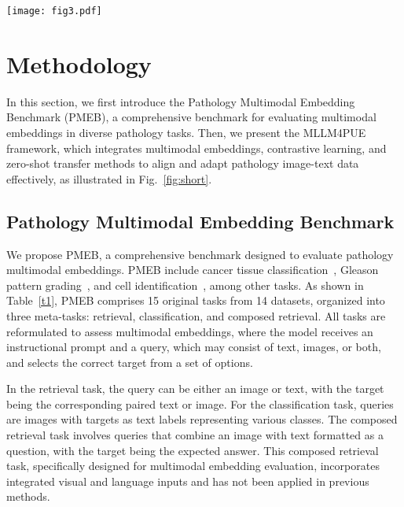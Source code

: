 \begin{figure*}
  \centering
\texttt{[image: fig3.pdf]}
  \caption{Overview of the MLLM4PUE framework. (a) Illustration of pathology image-text contrastive learning with our proposed method. With differents prompts, MLLM can generate embeddings for multimodal inputs. Image and text embeddings are aligned using a contrastive loss. (b) Zero transfer for classification. (c) Zero transfer for composed retrieval.}
  \label{fig:short}
  \vspace{-2ex}
\end{figure*}
\section{Methodology}
\label{sec:formatting}
In this section, we first introduce the Pathology Multimodal Embedding Benchmark (PMEB), a comprehensive benchmark for evaluating multimodal embeddings in diverse pathology tasks. Then, we present the MLLM4PUE framework, which integrates multimodal embeddings, contrastive learning, and zero-shot transfer methods to align and adapt pathology image-text data effectively, as illustrated in Fig.~\ref{fig:short}.
\subsection{Pathology Multimodal Embedding Benchmark}
We propose PMEB, a comprehensive benchmark designed to evaluate pathology multimodal embeddings. PMEB include cancer tissue classification~\cite{aresta2019bach, borkowski2019lung, kriegsmann2022deep}, Gleason pattern grading~\cite{silva2020going}, and cell identification~\cite{da2022digestpath}, among other tasks. As shown in Table~\ref{t1}, PMEB comprises 15 original tasks from 14 datasets, organized into three meta-tasks: retrieval, classification, and composed retrieval. All tasks are reformulated to assess multimodal embeddings, where the model receives an instructional prompt and a query, which may consist of text, images, or both, and selects the correct target from a set of options.

In the retrieval task, the query can be either an image or text, with the target being the corresponding paired text or image. For the classification task, queries are images with targets as text labels representing various classes. The composed retrieval task involves queries that combine an image with text formatted as a question, with the target being the expected answer. This composed retrieval task, specifically designed for multimodal embedding evaluation, incorporates integrated visual and language inputs and has not been applied in previous methods. 

